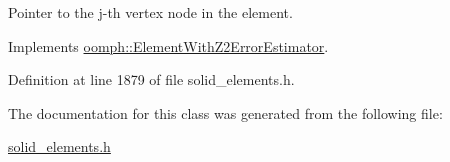 Pointer to the j-\/th vertex node in the element. 



Implements \hyperlink{classoomph_1_1ElementWithZ2ErrorEstimator_a0eedccc33519f852c5dc2055ddf2774b}{oomph\+::\+Element\+With\+Z2\+Error\+Estimator}.



Definition at line 1879 of file solid\+\_\+elements.\+h.



The documentation for this class was generated from the following file\+:\begin{DoxyCompactItemize}
\item 
\hyperlink{solid__elements_8h}{solid\+\_\+elements.\+h}\end{DoxyCompactItemize}
